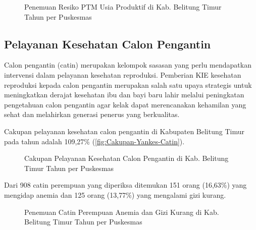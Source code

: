 \begin{figure}[H]
    \centering
    \caption{Penemuan Resiko PTM Usia Produktif di Kab. Belitung Timur Tahun \tP per Puskesmas}
    \label{fig:Cakupan-Resiko-PTM-Usprod}
\end{figure}

\subsection{Pelayanan Kesehatan Calon Pengantin}
Calon pengantin (catin) merupakan kelompok sasasan yang perlu mendapatkan intervensi dalam pelayanan kesehatan reproduksi.
Pemberian KIE kesehatan reproduksi kepada calon pengantin merupakan salah satu upaya strategis untuk meningkatkan derajat kesehatan ibu dan bayi baru lahir melalui peningkatan pengetahuan calon pengantin agar kelak dapat merencanakan kehamilan yang sehat dan melahirkan generasi penerus yang berkualitas.

Cakupan pelayanan kesehatan calon pengantin di Kabupaten Belitung Timur pada tahun \tP adalah 109,27\% (\autoref{fig:Cakupan-Yankes-Catin}).

\begin{figure}[H]
	\centering
	\caption{Cakupan Pelayanan Kesehatan Calon Pengantin di Kab. Belitung Timur Tahun \tP per Puskesmas}
	\label{fig:Cakupan-Yankes-Catin}
\end{figure}

Dari 908 catin perempuan yang diperiksa ditemukan 151 orang (16,63\%) yang mengidap anemia dan 125 orang (13,77\%) yang mengalami gizi kurang.

\begin{figure}[H]
	\centering
	\caption{Penemuan Catin Perempuan Anemia dan Gizi Kurang di Kab. Belitung Timur Tahun \tP per Puskesmas}
	\label{fig:Cakupan-Yankes-Catin-Anemia}
\end{figure}

